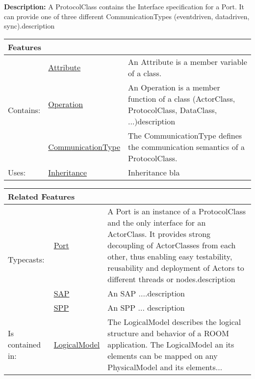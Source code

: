 			\textbf{Description:} A ProtocolClass contains the Interface specification for a Port. It can provide one of three different CommunicationTypes (eventdriven, datadriven, sync).description 
			
			
			\begingroup
			\renewcommand{\arraystretch}{1.8} %
			\begin{longtable}{p{2.5cm}|p{4cm} p{}}
				\multicolumn{2}{l}{\textbf{\large Features}} & \\
				\hline
			\multirow{3}{*}{Contains:} & \tabitem \hyperlink{ref:Attribute}{Attribute}  & An Attribute is a member variable of a class. \\
			& \tabitem \hyperlink{ref:Operation}{Operation}  & An Operation is a member function of a class (ActorClass, ProtocolClass, DataClass, ...)description  \\
			& \tabitem \hyperlink{ref:CommunicationType}{CommunicationType}  & The CommunicationType defines the communication semantics of a ProtocolClass. \\
			\hline
			Uses: & \tabitem \hyperlink{ref:Inheritance}{Inheritance}  & Inheritance bla\\
			\hline
			\end{longtable}
			\endgroup
			
			\begingroup
			\renewcommand{\arraystretch}{1.8} %
			\begin{longtable}{p{2.5cm}|p{4cm} p{}}
				\multicolumn{2}{l}{\textbf{\large Related Features}} & \\
				\hline
			\multirow{3}{*}{Typecasts:} & \tabitem \hyperlink{ref:Port}{Port}  & A Port is an instance of a ProtocolClass and the only interface for an ActorClass. It provides strong decoupling of ActorClasses from each other, thus enabling easy testability, reusability and deployment of Actors to different threads or nodes.description \\
			& \tabitem \hyperlink{ref:SAP}{SAP}  & An SAP ....description  \\
			& \tabitem \hyperlink{ref:SPP}{SPP}  & An SPP ... description \\
			\hline
			Is contained in: & \tabitem \hyperlink{ref:LogicalModel}{LogicalModel}  & The LogicalModel describes the logical structure and behavior of a ROOM application. The LogicalModel an its elements can be mapped on any PhysicalModel and its elements...\\
			\hline
			\end{longtable}
			\endgroup
			
